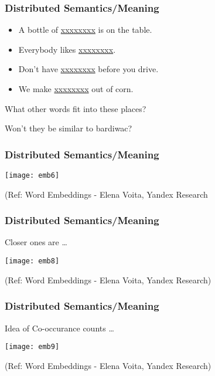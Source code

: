 \begin{frame}[fragile]\frametitle{Distributed Semantics/Meaning}
\begin{itemize}
\item  A bottle of \underline{xxxxxxxx} is on the table. 
\item  Everybody likes \underline{xxxxxxxx}.
\item  Don’t have \underline{xxxxxxxx} before you drive. 
\item  We make \underline{xxxxxxxx}  out of corn. 

\end{itemize}

What other words fit into these places? 

Won't they be similar to bardiwac?
\end{frame}

\begin{frame}[fragile]\frametitle{Distributed Semantics/Meaning}
\begin{center}
\texttt{[image: emb6]}
\end{center}

{\tiny (Ref: Word Embeddings - Elena Voita, Yandex Research}
\end{frame}



\begin{frame}[fragile]\frametitle{Distributed Semantics/Meaning}
Closer ones are \ldots

\begin{center}
\texttt{[image: emb8]}
\end{center}

{\tiny (Ref: Word Embeddings - Elena Voita, Yandex Research)}
\end{frame}


\begin{frame}[fragile]\frametitle{Distributed Semantics/Meaning}
Idea of Co-occurance counts \ldots

\begin{center}
\texttt{[image: emb9]}
\end{center}

{\tiny (Ref: Word Embeddings - Elena Voita, Yandex Research)}
\end{frame}

